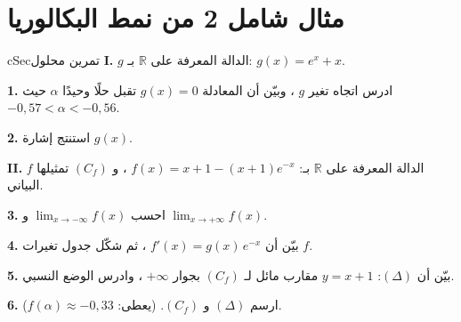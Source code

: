 \documentclass[12pt,a4paper]{article}
\newenvironment{BOX}[2]{\begin{otherlanguage}{english}\begin{arbox}{#1}{#2}}{\end{arbox}\end{otherlanguage}}
\newcounter{exo}
\newcommand{\R}{\mathbb{R}}
\newcommand{\QQ}[1]{\par\smallskip\textbf{#1.} }
\newenvironment{tmr}{\stepcounter{exo}\begin{BOX}{cSec}{تمرين محلول \theexo}}{\end{BOX}}
\newcommand{\Lm}[1]{\displaystyle\lim_{x\to#1}}
\begin{document}
\section{مثال شامل 2 من نمط البكالوريا}
\begin{tmr}
\textbf{I.} $g$ الدالة المعرفة على $\R$ بـ: $g(x)=e^x+x$.
\QQ{1} ادرس اتجاه تغير $g$ ، وبيّن أن المعادلة $g(x)=0$ تقبل حلًا وحيدًا $\alpha$ حيث $-0{,}57<\alpha<-0{,}56$.
\QQ{2} استنتج إشارة $g(x)$.\par
\textbf{II.} $f$ الدالة المعرفة على $\R$ بـ: $f(x)=x+1-(x+1)e^{-x}$ ، و $(C_f)$ تمثيلها البياني.
\QQ{3} احسب $\Lm{-\infty}f(x)$ و $\Lm{+\infty}f(x)$.
\QQ{4} بيّن أن $f'(x)=g(x)\,e^{-x}$ ، ثم شكّل جدول تغيرات $f$.
\QQ{5} بيّن أن $(\Delta)$: $y=x+1$ مقارب مائل لـ $(C_f)$ بجوار $+\infty$ ، وادرس الوضع النسبي.
\QQ{6} ارسم $(\Delta)$ و $(C_f)$. (يعطى: $f(\alpha)\approx-0{,}33$).
\end{tmr}
\end{document}
